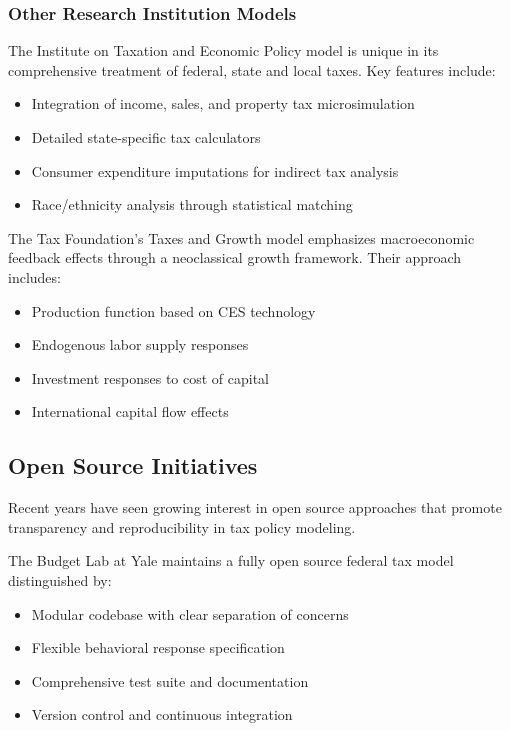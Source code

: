 \subsubsection{Other Research Institution Models}

The Institute on Taxation and Economic Policy model \cite{itep2024} is unique in its comprehensive treatment of federal, state and local taxes. Key features include:

\begin{itemize}
    \item Integration of income, sales, and property tax microsimulation
    \item Detailed state-specific tax calculators
    \item Consumer expenditure imputations for indirect tax analysis
    \item Race/ethnicity analysis through statistical matching
\end{itemize}

The Tax Foundation's Taxes and Growth model \cite{tf2024} emphasizes macroeconomic feedback effects through a neoclassical growth framework. Their approach includes:

\begin{itemize}
    \item Production function based on CES technology
    \item Endogenous labor supply responses
    \item Investment responses to cost of capital
    \item International capital flow effects
\end{itemize}

\subsection{Open Source Initiatives}

Recent years have seen growing interest in open source approaches that promote transparency and reproducibility in tax policy modeling.

The Budget Lab at Yale \cite{budgetlab2024} maintains a fully open source federal tax model distinguished by:

\begin{itemize}
    \item Modular codebase with clear separation of concerns
    \item Flexible behavioral response specification
    \item Comprehensive test suite and documentation
    \item Version control and continuous integration
\end{itemize}

